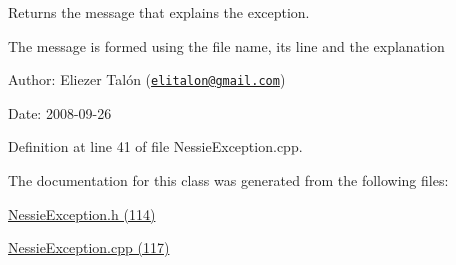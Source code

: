 Returns the message that explains the exception. 

The message is formed using the file name, its line and the explanation

\begin{Desc}
\item[Author:]Eliezer Talón (\href{mailto:elitalon@gmail.com}{\tt elitalon@gmail.com}) \end{Desc}
\begin{Desc}
\item[Date:]2008-09-26 \end{Desc}


Definition at line 41 of file NessieException.cpp.

The documentation for this class was generated from the following files:\begin{CompactItemize}
\item 
\hyperlink{_nessie_exception_8h}{NessieException.h (114)}\item 
\hyperlink{_nessie_exception_8cpp}{NessieException.cpp (117)}\end{CompactItemize}
